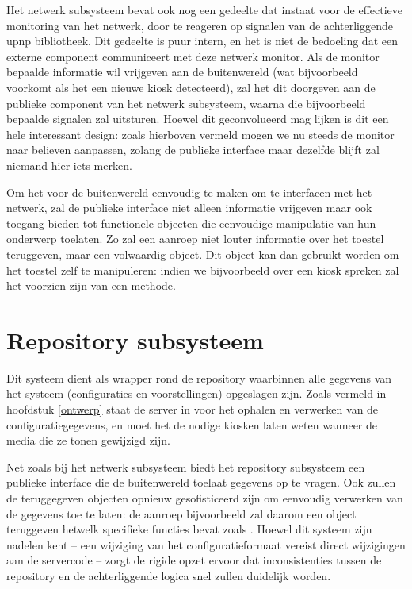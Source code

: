 Het netwerk subsysteem bevat ook nog een gedeelte dat instaat voor de effectieve monitoring van het netwerk, door te reageren op signalen van de achterliggende \ac{upnp} bibliotheek. Dit gedeelte is puur intern, en het is niet de bedoeling dat een externe component communiceert met deze netwerk monitor. Als de monitor bepaalde informatie wil vrijgeven aan de buitenwereld (wat bijvoorbeeld voorkomt als het een nieuwe kiosk detecteerd), zal het dit doorgeven aan de publieke component van het netwerk subsysteem, waarna die bijvoorbeeld bepaalde signalen zal uitsturen. Hoewel dit geconvolueerd mag lijken is dit een hele interessant design: zoals hierboven vermeld mogen we nu steeds de monitor naar believen aanpassen, zolang de publieke interface maar dezelfde blijft zal niemand hier iets merken.

Om het voor de buitenwereld eenvoudig te maken om te interfacen met het netwerk, zal de publieke interface niet alleen informatie vrijgeven maar ook toegang bieden tot functionele objecten die eenvoudige manipulatie van hun onderwerp toelaten. Zo zal een  aanroep niet louter informatie over het toestel teruggeven, maar een volwaardig  object. Dit object kan dan gebruikt worden om het toestel zelf te manipuleren: indien we bijvoorbeeld over een kiosk spreken zal het voorzien zijn van een  methode.

\section{Repository subsysteem}
\label{server:structuur:repository}

Dit systeem dient als wrapper rond de repository waarbinnen alle gegevens van het systeem (configuraties en voorstellingen) opgeslagen zijn. Zoals vermeld in hoofdstuk \ref{ontwerp} staat de server in voor het ophalen en verwerken van de configuratiegegevens, en moet het de nodige kiosken laten weten wanneer de media die ze tonen gewijzigd zijn.

Net zoals bij het netwerk subsysteem biedt het repository subsysteem een publieke interface die de buitenwereld toelaat gegevens op te vragen. Ook zullen de teruggegeven objecten opnieuw gesofisticeerd zijn om eenvoudig verwerken van de gegevens toe te laten: de  aanroep bijvoorbeeld zal daarom een  object teruggeven hetwelk specifieke functies bevat zoals . Hoewel dit systeem zijn nadelen kent -- een wijziging van het configuratieformaat vereist direct wijzigingen aan de servercode -- zorgt de rigide opzet ervoor dat inconsistenties tussen de repository en de achterliggende logica snel zullen duidelijk worden. 

